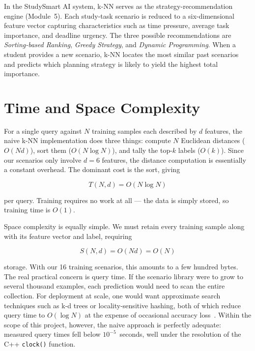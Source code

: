 \documentclass[12pt,a4paper]{article}
\begin{document}
In the StudySmart AI system, k-NN serves as the strategy-recommendation
engine (Module~5).  Each study-task scenario is reduced to a
six-dimensional feature vector capturing characteristics such as time
pressure, average task importance, and deadline urgency.  The three
possible recommendations are \emph{Sorting-based Ranking},
\emph{Greedy Strategy}, and \emph{Dynamic Programming}.  When a
student provides a new scenario, k-NN locates the most similar past
scenarios and predicts which planning strategy is likely to yield the
highest total importance.


\section{Time and Space Complexity}

For a single query against \(N\) training samples each described by
\(d\) features, the naive k-NN implementation does three things:
compute \(N\) Euclidean distances (\(O(Nd)\)), sort them
(\(O(N \log N)\)), and tally the top-\(k\) labels (\(O(k)\)).
Since our scenarios only involve \(d = 6\) features, the distance
computation is essentially a constant overhead.  The dominant cost is
the sort, giving

\begin{equation}
  T(N, d) = O(N \log N)
\end{equation}

per query.  Training requires no work at all --- the data is simply
stored, so training time is \(O(1)\).

Space complexity is equally simple.  We must retain every training
sample along with its feature vector and label, requiring

\begin{equation}
  S(N, d) = O(Nd) = O(N)
\end{equation}

storage.  With our 16 training scenarios, this amounts to a few
hundred bytes.  The real practical concern is query time.
If the scenario library were to grow to several thousand examples,
each prediction would need to scan the entire collection.  For
deployment at scale, one would want approximate search techniques
such as k-d trees or locality-sensitive hashing, both of which
reduce query time to \(O(\log N)\) at the expense of occasional
accuracy loss~\cite{aha1991instance}.  Within the scope of this
project, however, the naive approach is perfectly adequate:
measured query times fell below \(10^{-5}\)~seconds, well under the
resolution of the C++ \texttt{clock()} function.
\end{document}
